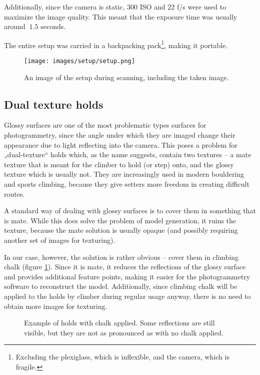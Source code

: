 Additionally, since the camera is static, 300 ISO and 22 f/s were used to maximize the image quality.
This meant that the exposure time was usually around $~1.5$ seconds.

The entire setup was carried in a backpacking pack\footnote{Excluding the plexiglass, which is inflexible, and the camera, which is fragile.}, making it portable.

\begin{figure}
	\centering
	\texttt{[image: images/setup/setup.png]}
	\caption{An image of the setup during scanning, including the taken image.}
\end{figure}

\subsection{Dual texture holds}
Glossy surfaces are one of the most problematic types surfaces for photogrammetry, since the angle under which they are imaged change their appearance due to light reflecting into the camera.
This poses a problem for „dual-texture“ holds which, as the name suggests, contain two textures -- a mate texture that is meant for the climber to hold (or step) onto, and the glossy texture which is usually not.
They are increasingly used in modern bouldering and sports climbing, because they give setters more freedom in creating difficult routes.

A standard way of dealing with glossy surfaces is to cover them in something that is mate.
While this does solve the problem of model generation, it ruins the texture, because the mate solution is usually opaque (and possibly requiring another set of images for texturing).

In our case, however, the solution is rather obvious -- cover them in climbing chalk (figure \ref{fig:chalk}).
Since it is mate, it reduces the reflections of the glossy surface and provides additional feature points, making it easier for the photogrammetry software to reconstruct the model.
Additionally, since climbing chalk will be applied to the holds by climber during regular usage anyway, there is no need to obtain more images for texturing.

\begin{figure}
	\centering
	\hfill
	\hfill
	\caption{Example of holds with chalk applied. Some reflections are still visible, but they are not as pronounced as with no chalk applied.}%
	\label{fig:chalk}
\end{figure}

